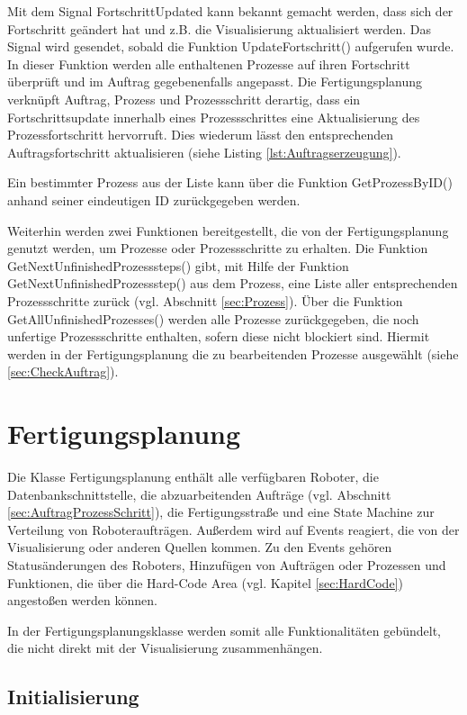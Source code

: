 Mit dem Signal FortschrittUpdated kann bekannt gemacht werden, dass sich der Fortschritt geändert hat und z.B. die Visualisierung aktualisiert werden. Das Signal wird gesendet, sobald die Funktion UpdateFortschritt() aufgerufen wurde. In dieser Funktion werden alle enthaltenen Prozesse auf ihren Fortschritt überprüft und im Auftrag gegebenenfalls angepasst. Die Fertigungsplanung verknüpft Auftrag, Prozess und Prozessschritt derartig, dass ein Fortschrittsupdate innerhalb eines Prozessschrittes eine Aktualisierung des Prozessfortschritt hervorruft. Dies wiederum lässt den entsprechenden Auftragsfortschritt aktualisieren (siehe Listing \ref{lst:Auftragserzeugung}).

Ein bestimmter Prozess aus der Liste kann über die Funktion GetProzessByID() anhand seiner eindeutigen ID zurückgegeben werden. 

Weiterhin werden zwei Funktionen bereitgestellt, die von der Fertigungsplanung genutzt werden, um Prozesse oder Prozessschritte zu erhalten. Die Funktion GetNextUnfinishedProzesssteps() gibt, mit Hilfe der Funktion GetNextUnfinishedProzessstep() aus dem Prozess, eine Liste aller entsprechenden Prozessschritte zurück (vgl. Abschnitt \ref{sec:Prozess}). Über die Funktion GetAllUnfinishedProzesses() werden alle Prozesse zurückgegeben, die noch unfertige Prozessschritte enthalten, sofern diese nicht blockiert sind. Hiermit werden in der Fertigungsplanung die zu bearbeitenden Prozesse ausgewählt (siehe \ref{sec:CheckAuftrag}).

\section{Fertigungsplanung}
\label{sec:Fertigungsplanung}

Die Klasse Fertigungsplanung enthält alle verfügbaren Roboter, die Datenbankschnittstelle, die abzuarbeitenden Aufträge (vgl. Abschnitt \ref{sec:AuftragProzessSchritt}), die Fertigungsstraße und eine State Machine zur Verteilung von Roboteraufträgen. Außerdem wird auf Events reagiert, die von der Visualisierung oder anderen Quellen kommen. Zu den Events gehören Statusänderungen des Roboters, Hinzufügen von Aufträgen oder Prozessen und Funktionen, die über die Hard-Code Area (vgl. Kapitel \ref{sec:HardCode}) angestoßen werden können. 

In der Fertigungsplanungsklasse werden somit alle Funktionalitäten gebündelt, die nicht direkt mit der Visualisierung zusammenhängen. 

\subsection{Initialisierung}
\label{sec:Fertigunginit}

